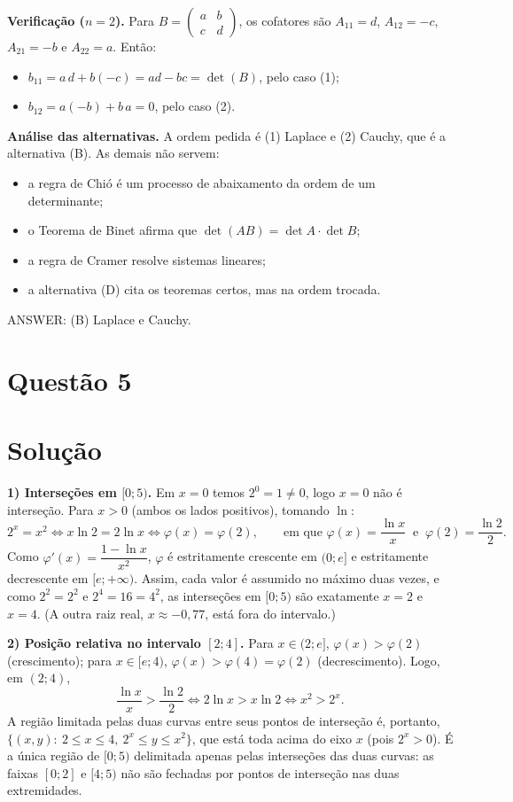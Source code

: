 \documentclass{article}%
\begin{document}
\textbf{Verificação ($n=2$).} Para $B=\begin{pmatrix}a&b\\c&d\end{pmatrix}$, os cofatores são $A_{11}=d$, $A_{12}=-c$, $A_{21}=-b$ e $A_{22}=a$. Então:
\begin{itemize}
\item $b_{11}=a\,d+b(-c)=ad-bc=\det(B)$, pelo caso (1);
\item $b_{12}=a(-b)+b\,a=0$, pelo caso (2).
\end{itemize}

\textbf{Análise das alternativas.} A ordem pedida é (1) Laplace e (2) Cauchy, que é a alternativa (B). As demais não servem:
\begin{itemize}
\item a regra de Chió é um processo de abaixamento da ordem de um determinante;
\item o Teorema de Binet afirma que $\det(AB)=\det A\cdot\det B$;
\item a regra de Cramer resolve sistemas lineares;
\item a alternativa (D) cita os teoremas certos, mas na ordem trocada.
\end{itemize}

ANSWER: (B) Laplace e Cauchy.%
\newpage%
\section*{Questão 5}

\section*{Solução}

\textbf{1) Interseções em $[0;5)$.} Em $x=0$ temos $2^0=1\neq 0$, logo $x=0$ não é interseção. Para $x>0$ (ambos os lados positivos), tomando $\ln$:
\[
2^x=x^2 \iff x\ln 2=2\ln x \iff \varphi(x)=\varphi(2), \qquad \text{em que } \varphi(x)=\frac{\ln x}{x}\ \text{ e }\ \varphi(2)=\frac{\ln 2}{2}.
\]
Como $\varphi'(x)=\dfrac{1-\ln x}{x^2}$, $\varphi$ é estritamente crescente em $(0;e]$ e estritamente decrescente em $[e;+\infty)$. Assim, cada valor é assumido no máximo duas vezes, e como $2^2=2^2$ e $2^4=16=4^2$, as interseções em $[0;5)$ são exatamente $x=2$ e $x=4$. (A outra raiz real, $x\approx-0{,}77$, está fora do intervalo.)

\textbf{2) Posição relativa no intervalo $[2;4]$.} Para $x\in(2;e]$, $\varphi(x)>\varphi(2)$ (crescimento); para $x\in[e;4)$, $\varphi(x)>\varphi(4)=\varphi(2)$ (decrescimento). Logo, em $(2;4)$,
\[
\frac{\ln x}{x}>\frac{\ln 2}{2}\iff 2\ln x>x\ln 2\iff x^2>2^x .
\]
A região limitada pelas duas curvas entre seus pontos de interseção é, portanto,
$\{(x,y):\ 2\le x\le 4,\ 2^x\le y\le x^2\}$, que está toda acima do eixo $x$ (pois $2^x>0$). É a única região de $[0;5)$ delimitada apenas pelas interseções das duas curvas: as faixas $[0;2]$ e $[4;5)$ não são fechadas por pontos de interseção nas duas extremidades.
\end{document}

